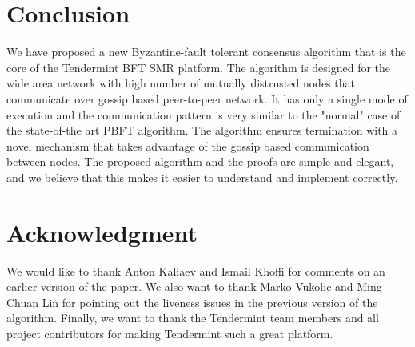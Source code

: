 \section{Conclusion} \label{sec:conclusion}

We have proposed a new Byzantine-fault tolerant consensus algorithm that is the
core of the Tendermint BFT SMR platform. The algorithm is designed for the wide
area network with high number of mutually distrusted nodes that communicate
over gossip based peer-to-peer network. It has only a single mode of execution
and the communication pattern is very similar to the "normal" case of the
state-of-the art PBFT algorithm. The algorithm ensures termination with a novel
mechanism that takes advantage of the gossip based communication between nodes.
The proposed algorithm and the proofs are simple and elegant, and we believe
that this makes it easier to understand and implement correctly.   

\section*{Acknowledgment}

We would like to thank Anton Kaliaev and Ismail Khoffi for comments on an earlier version of the paper. We also want to thank Marko Vukolic and Ming Chuan Lin for pointing out the liveness issues
in the previous version of the algorithm. Finally, we want to thank the Tendermint team members and all project contributors for making Tendermint such a great platform.  
